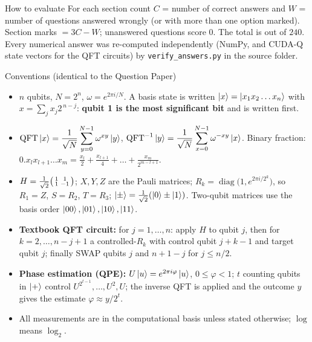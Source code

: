 \documentclass[11pt,a4paper]{article}
\begin{document}
\begin{infobox}{How to evaluate}
For each section count $C$ = number of correct answers and $W$ = number of questions answered wrongly (or with more than one option marked). Section marks $= 3C - W$; unanswered questions score $0$. The total is out of $240$.
Every numerical answer was re-computed independently (NumPy, and CUDA-Q state vectors for the QFT circuits) by
\texttt{verify\_answers.py} in the source folder.
\end{infobox}
\begin{infobox}{Conventions (identical to the Question Paper)}

\begin{itemize}[leftmargin=1.2em, itemsep=1pt, topsep=2pt]
\item $n$ qubits, $N = 2^n$, $\omega = e^{2\pi i/N}$. A basis state is written $\ket{x} = \ket{x_1x_2\dots x_n}$ with
      $x = \sum_{j} x_j 2^{\,n-j}$: \textbf{qubit 1 is the most significant bit} and is written first.
\item $\displaystyle \mathrm{QFT}\ket{x} = \frac{1}{\sqrt N}\sum_{y=0}^{N-1}\omega^{xy}\ket{y}$, \quad
      $\displaystyle \mathrm{QFT}^{-1}\ket{y} = \frac{1}{\sqrt N}\sum_{x=0}^{N-1}\omega^{-xy}\ket{x}$.
      Binary fraction: $0.x_lx_{l+1}\dots x_m = \frac{x_l}{2} + \frac{x_{l+1}}{4} + \dots + \frac{x_m}{2^{m-l+1}}$.
\item $H = \frac{1}{\sqrt2}\begin{psmallmatrix}1&1\\1&-1\end{psmallmatrix}$; $X, Y, Z$ are the Pauli matrices;
      $R_k = \operatorname{diag}\big(1, e^{2\pi i/2^k}\big)$, so $R_1 = Z$, $S = R_2$, $T = R_3$;
      $\ket{\pm} = \frac{1}{\sqrt2}(\ket0 \pm \ket1)$. Two-qubit matrices use the basis order $\ket{00}, \ket{01}, \ket{10}, \ket{11}$.
\item \textbf{Textbook QFT circuit:} for $j = 1, \dots, n$: apply $H$ to qubit $j$, then for $k = 2, \dots, n-j+1$ a controlled-$R_k$
      with control qubit $j+k-1$ and target qubit $j$; finally SWAP qubits $j$ and $n+1-j$ for $j \le n/2$.
\item \textbf{Phase estimation (QPE):} $U\ket{u} = e^{2\pi i\varphi}\ket{u}$, $0 \le \varphi < 1$; $t$ counting qubits in $\ket{+}$ control
      $U^{2^{t-1}}, \dots, U^{2}, U$; the inverse QFT is applied and the outcome $y$ gives the estimate $\varphi \approx y/2^t$.
\item All measurements are in the computational basis unless stated otherwise; $\log$ means $\log_2$.
\end{itemize}
\end{infobox}
\newpage
\end{document}
